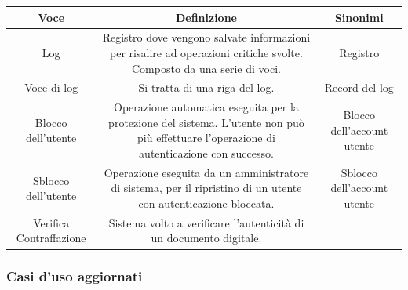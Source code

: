 \documentclass[a4paper]{article}
\begin{document}
  \begin{center}
    \begin{tabulary}{1\textwidth}{|c|C|C|}
        \hline
        \textbf{Voce} & \textbf{Definizione} & \textbf{Sinonimi}\\
        \hline
        \hline
		Log & Registro dove vengono salvate informazioni per risalire ad operazioni critiche svolte. Composto da una serie di voci. & Registro \\
		\hline
		Voce di log & Si tratta di una riga del log. & Record del log\\
		\hline
		Blocco dell'utente & Operazione automatica eseguita per la protezione del sistema. L'utente non può più effettuare l'operazione di autenticazione con successo. & Blocco dell'account utente \\
		\hline
		Sblocco dell'utente & Operazione eseguita da un amministratore di sistema, per il ripristino di un utente con autenticazione bloccata. & Sblocco dell'account utente\\
		\hline
		Verifica Contraffazione & Sistema volto a verificare l'autenticità di un documento digitale. & \\
		\hline
    \end{tabulary}
  \end{center}

\newpage

\subsubsection{Casi d'uso aggiornati}

\end{document}
